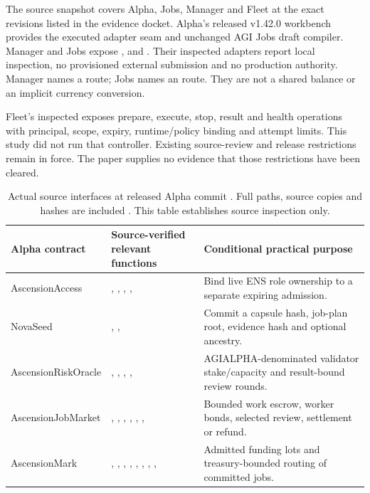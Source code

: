 The source snapshot covers Alpha, Jobs, Manager and Fleet at the exact revisions listed in the evidence docket. Alpha's released v1.42.0 workbench provides the executed adapter seam and unchanged AGI Jobs draft compiler. Manager and Jobs expose ,  and . Their inspected adapters report local inspection, no provisioned external submission and no production authority. Manager names a  route; Jobs names an  route. They are not a shared balance or an implicit currency conversion.

Fleet's inspected  exposes prepare, execute, stop, result and health operations with principal, scope, expiry, runtime/policy binding and attempt limits. This study did not run that controller. Existing source-review and release restrictions remain in force. The paper supplies no evidence that those restrictions have been cleared.

\begin{table}[ht]\centering\small
\begin{tabularx}{\linewidth}{L{31mm}YY}
\toprule
Alpha contract & Source-verified relevant functions & Conditional practical purpose \\
\midrule
AscensionAccess & , , , ,  & Bind live ENS role ownership to a separate expiring admission. \\
NovaSeed & , ,  & Commit a capsule hash, job-plan root, evidence hash and optional ancestry. \\
AscensionRiskOracle & , , , ,  & AGIALPHA-denominated validator stake/capacity and result-bound review rounds. \\
AscensionJobMarket & , , , , , ,  & Bounded work escrow, worker bonds, selected review, settlement or refund. \\
AscensionMark & , , , , , , , ,  & Admitted funding lots and treasury-bounded routing of committed jobs. \\
\bottomrule
\end{tabularx}
\caption{Actual source interfaces at released Alpha commit . Full paths, source copies and hashes are included \citep{alphaAscensionSource2026}. This table establishes source inspection only.}
\end{table}

